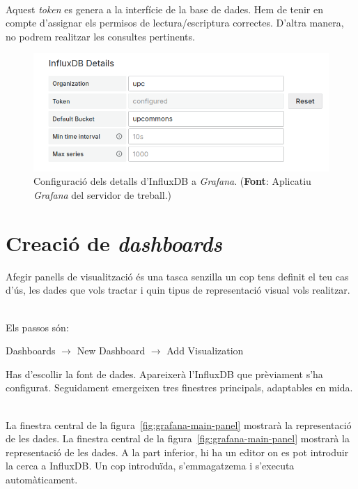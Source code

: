 \noindent \\
Aquest \textit{token} es genera a la interfície de la base de dades.
Hem de tenir en compte d'assignar els permisos de lectura/escriptura correctes.
D'altra manera, no podrem realitzar les consultes pertinents.

\begin{figure}[htbp]
    \centerline{\includegraphics[width=\textwidth]{figures/grafana-influxdb-details}}
    \captionsetup{justification=centering}
    \caption[Configuració dels detalls d'InfluxDB a \textit{Grafana}.]{Configuració dels detalls d'InfluxDB a \textit{Grafana}. (\textbf{Font}: Aplicatiu \textit{Grafana} del servidor de treball.)}\label{fig:grafana-influxdb-details}
\end{figure}

\clearpage

\section*{Creació de \textit{dashboards}}\label{sec:grafana-dashboards}

\noindent
Afegir panells de visualització és una tasca senzilla un cop tens definit el teu cas d'ús, les dades que vols tractar i quin tipus de representació visual vols realitzar.

\noindent \\
Els passos són:
\begin{center}
    Dashboards \(\rightarrow\) New Dashboard \(\rightarrow\) Add Visualization
\end{center}

\noindent
Has d'escollir la font de dades.
Apareixerà l'InfluxDB que prèviament s'ha configurat.
Seguidament emergeixen tres finestres principals, adaptables en mida.

\noindent \\
La finestra central de la figura~\ref{fig:grafana-main-panel} mostrarà la representació de les dades.
La finestra central de la figura~\ref{fig:grafana-main-panel} mostrarà la representació de les dades.
A la part inferior, hi ha un editor on es pot introduir la cerca a InfluxDB.
Un cop introduïda, s'emmagatzema i s'executa automàticament.

